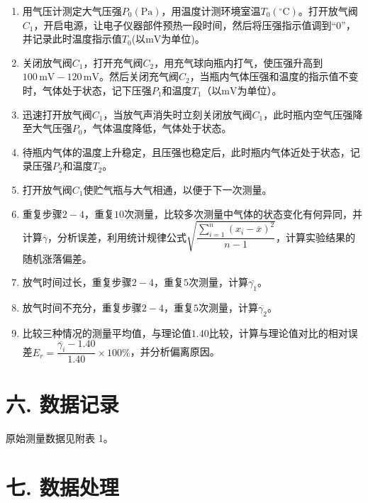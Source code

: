 \documentclass[12pt,a4paper]{article}
\begin{document}
	\begin{enumerate}
    \item 用气压计测定大气压强$P_0(\text{Pa})$，用温度计测环境室温$T_0(^{\circ}\mathrm{C})$。打开放气阀$C_1$，开启电源，让电子仪器部件预热一段时间，然后将压强指示值调到“$0$”，并记录此时温度指示值$T_0$(以$\mathrm{mV}$为单位)。
    \item 关闭放气阀$C_1$，打开充气阀$C_2$，用充气球向瓶内打气，使压强升高到$100\,\mathrm{mV}-120\,\mathrm{mV}$。然后关闭充气阀$C_2$，当瓶内气体压强和温度的指示值不变时，气体处于状态\uppercase\expandafter{}，记下压强$P_1$和温度$T_1$（以$\mathrm{mV}$为单位）。
    \item 迅速打开放气阀$C_1$，当放气声消失时立刻关闭放气阀$C_1$，此时瓶内空气压强降至大气压强$P_0$，气体温度降低，气体处于状态\uppercase\expandafter{}。
    \item 待瓶内气体的温度上升稳定，且压强也稳定后，此时瓶内气体近处于状态\uppercase\expandafter{}，记录压强$P_2$和温度$T_2$。
    \item 打开放气阀$C_1$使贮气瓶与大气相通，以便于下一次测量。
    \item 重复步骤$2-4$，重复$10$次测量，比较多次测量中气体的状态变化有何异同，并计算$\overline{\gamma}$，分析误差，利用统计规律公式$\sqrt{\dfrac{\sum_{i=1}^{n}(x_i-\overline{x})^2}{n-1}}$，计算实验结果的随机涨落偏差。
    \item 放气时间过长，重复步骤$2-4$，重复$5$次测量，计算$\overline{\gamma_1}$。
    \item 放气时间不充分，重复步骤$2-4$，重复$5$次测量，计算$\overline{\gamma_2}$。
    \item 比较三种情况的测量平均值，与理论值$1.40$比较，计算与理论值对比的相对误差$E_r=\dfrac{\overline{\gamma_i}-1.40}{1.40}\times100\%$，并分析偏离原因。
\end{enumerate}
	
	\section*{\textbf{{六. 数据记录}}}
	
	原始测量数据见附表 1。

	\section*{\textbf{{七. 数据处理}}}
\end{document}
